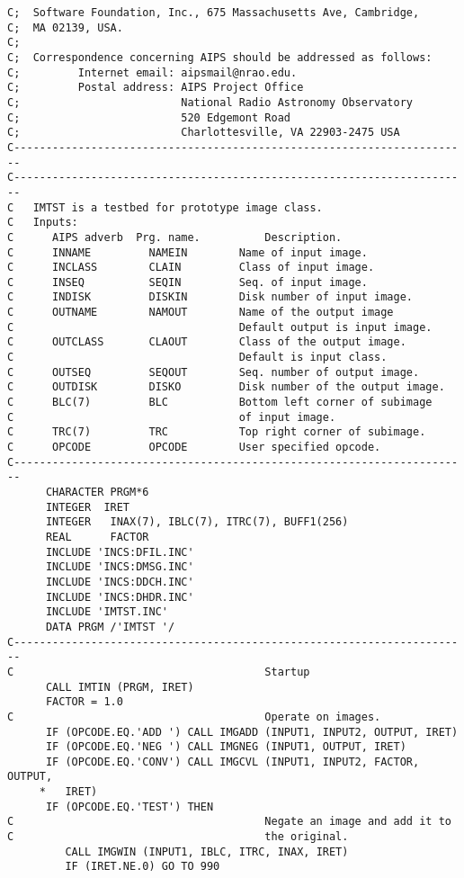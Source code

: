 {\begin{verbatim}
C;  Software Foundation, Inc., 675 Massachusetts Ave, Cambridge,
C;  MA 02139, USA.
C;
C;  Correspondence concerning AIPS should be addressed as follows:
C;         Internet email: aipsmail@nrao.edu.
C;         Postal address: AIPS Project Office
C;                         National Radio Astronomy Observatory
C;                         520 Edgemont Road
C;                         Charlottesville, VA 22903-2475 USA
C-----------------------------------------------------------------------
C-----------------------------------------------------------------------
C   IMTST is a testbed for prototype image class.
C   Inputs:
C      AIPS adverb  Prg. name.          Description.
C      INNAME         NAMEIN        Name of input image.
C      INCLASS        CLAIN         Class of input image.
C      INSEQ          SEQIN         Seq. of input image.
C      INDISK         DISKIN        Disk number of input image.
C      OUTNAME        NAMOUT        Name of the output image
C                                   Default output is input image.
C      OUTCLASS       CLAOUT        Class of the output image.
C                                   Default is input class.
C      OUTSEQ         SEQOUT        Seq. number of output image.
C      OUTDISK        DISKO         Disk number of the output image.
C      BLC(7)         BLC           Bottom left corner of subimage
C                                   of input image.
C      TRC(7)         TRC           Top right corner of subimage.
C      OPCODE         OPCODE        User specified opcode.
C-----------------------------------------------------------------------
      CHARACTER PRGM*6
      INTEGER  IRET
      INTEGER   INAX(7), IBLC(7), ITRC(7), BUFF1(256)
      REAL      FACTOR
      INCLUDE 'INCS:DFIL.INC'
      INCLUDE 'INCS:DMSG.INC'
      INCLUDE 'INCS:DDCH.INC'
      INCLUDE 'INCS:DHDR.INC'
      INCLUDE 'IMTST.INC'
      DATA PRGM /'IMTST '/
C-----------------------------------------------------------------------
C                                       Startup
      CALL IMTIN (PRGM, IRET)
      FACTOR = 1.0
C                                       Operate on images.
      IF (OPCODE.EQ.'ADD ') CALL IMGADD (INPUT1, INPUT2, OUTPUT, IRET)
      IF (OPCODE.EQ.'NEG ') CALL IMGNEG (INPUT1, OUTPUT, IRET)
      IF (OPCODE.EQ.'CONV') CALL IMGCVL (INPUT1, INPUT2, FACTOR, OUTPUT,
     *   IRET)
      IF (OPCODE.EQ.'TEST') THEN
C                                       Negate an image and add it to
C                                       the original.
         CALL IMGWIN (INPUT1, IBLC, ITRC, INAX, IRET)
         IF (IRET.NE.0) GO TO 990

\end{verbatim}}
